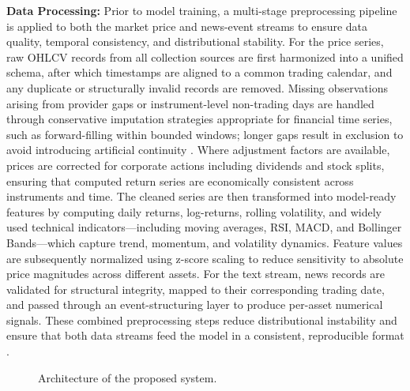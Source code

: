 \documentclass[a4paper,fleqn]{cas-sc}
\begin{document}
\noindent\textbf{Data Processing: } Prior to model training, a multi-stage preprocessing pipeline is applied to both the market price and news-event streams to ensure data quality, temporal consistency, and distributional stability. For the price series, raw OHLCV records from all collection sources are first harmonized into a unified schema, after which timestamps are aligned to a common trading calendar, and any duplicate or structurally invalid records are removed. Missing observations arising from provider gaps or instrument-level non-trading days are handled through conservative imputation strategies appropriate for financial time series, such as forward-filling within bounded windows; longer gaps result in exclusion to avoid introducing artificial continuity \cite{brockwell2002}. Where adjustment factors are available, prices are corrected for corporate actions including dividends and stock splits, ensuring that computed return series are economically consistent across instruments and time. The cleaned series are then transformed into model-ready features by computing daily returns, log-returns, rolling volatility, and widely used technical indicators—including moving averages, RSI, MACD, and Bollinger Bands—which capture trend, momentum, and volatility dynamics. Feature values are subsequently normalized using z-score scaling to reduce sensitivity to absolute price magnitudes across different assets. For the text stream, news records are validated for structural integrity, mapped to their corresponding trading date, and passed through an event-structuring layer to produce per-asset numerical signals. These combined preprocessing steps reduce distributional instability and ensure that both data streams feed the model in a consistent, reproducible format \cite{geron2022}  . 
\begin{figure}[H]
  \centering
  
  \caption{Architecture of the proposed system.}
  \label{fig:model-training}
\end{figure}
\FloatBarrier
\end{document}
